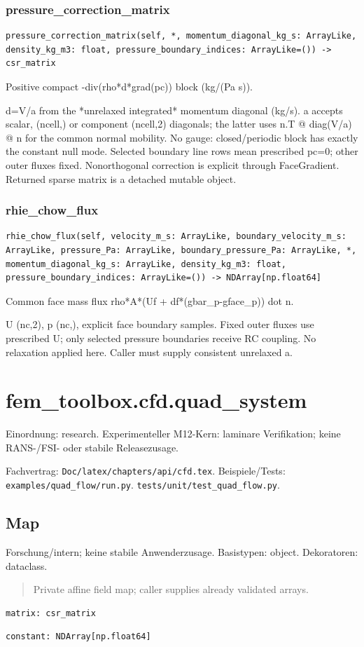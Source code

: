 \subsubsection*{pressure\_correction\_matrix}
\begin{lstlisting}
pressure_correction_matrix(self, *, momentum_diagonal_kg_s: ArrayLike, density_kg_m3: float, pressure_boundary_indices: ArrayLike=()) -> csr_matrix
\end{lstlisting}
Positive compact -div(rho*d*grad(pc)) block (kg/(Pa s)).\par d=V/a from the *unrelaxed integrated* momentum diagonal (kg/s). a accepts scalar, (ncell,) or component (ncell,2) diagonals; the latter uses n.T @ diag(V/a) @ n for the common normal mobility. No gauge: closed/periodic block has exactly the constant null mode. Selected boundary line rows mean prescribed pc=0; other outer fluxes fixed. Nonorthogonal correction is explicit through FaceGradient. Returned sparse matrix is a detached mutable object.
\subsubsection*{rhie\_chow\_flux}
\begin{lstlisting}
rhie_chow_flux(self, velocity_m_s: ArrayLike, boundary_velocity_m_s: ArrayLike, pressure_Pa: ArrayLike, boundary_pressure_Pa: ArrayLike, *, momentum_diagonal_kg_s: ArrayLike, density_kg_m3: float, pressure_boundary_indices: ArrayLike=()) -> NDArray[np.float64]
\end{lstlisting}
Common face mass flux rho*A*(Uf + df*(gbar\_p-gface\_p)) dot n.\par U (nc,2), p (nc,), explicit face boundary samples. Fixed outer fluxes use prescribed U; only selected pressure boundaries receive RC coupling. No relaxation applied here. Caller must supply consistent unrelaxed a.
\section{fem\_toolbox.cfd.quad\_system}
Einordnung: research. Experimenteller M12-Kern: laminare Verifikation; keine RANS-/FSI- oder stabile Releasezusage.
\par Fachvertrag: \nolinkurl{Doc/latex/chapters/api/cfd.tex}. Beispiele/Tests:
\nolinkurl{examples/quad_flow/run.py}.
\nolinkurl{tests/unit/test_quad_flow.py}.
\subsection{Map}
Forschung/intern; keine stabile Anwenderzusage.
Basistypen: object. Dekoratoren: dataclass.
\begin{quote}
Private affine field map; caller supplies already validated arrays.
\end{quote}
\begin{lstlisting}
matrix: csr_matrix
\end{lstlisting}
\begin{lstlisting}
constant: NDArray[np.float64]
\end{lstlisting}
